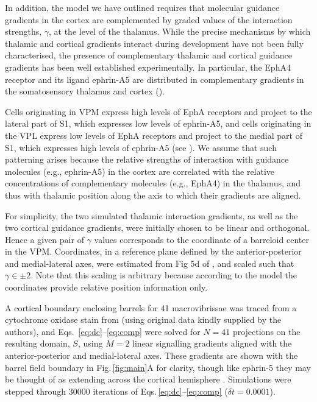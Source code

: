 \documentclass[9pt,lineno]{elife}
\newcommand{\cmnt}[1]{\textcolor{colcmnt}{#1}}
\newcommand{\MPone}[1]{\textcolor{colmpone}{#1}}
\newcommand{\mpfour}[1]{\textcolor{colmpfour}{#1}}
\begin{document}
\MPone{In addition, the model we have outlined requires that molecular
  guidance gradients in the cortex are complemented by graded values of the
  interaction strengths, $\gamma$, at the level of the thalamus. While the
  precise mechanisms by which thalamic and cortical gradients interact during
  development have not been fully characterised, the presence of complementary
  thalamic and cortical guidance gradients has been well established
  experimentally. In particular, the EphA4 receptor and its ligand ephrin-A5
  are distributed in complementary gradients in the somatosensory thalamus and
  cortex} (\citealp{vanderhaeghen_mapping_2000,miller_epha7-ephrin-a5_2006}).

\MPone{Cells originating in VPM express high levels of EphA receptors and
  project to the lateral part of S1, which expresses low levels of ephrin-A5,
  and cells originating in the VPL express low levels of EphA receptors and
  project to the medial part of S1, which expresses high levels of ephrin-A5}
(see
\citealp{gao_regulation_1998,dufour_area_2003,vanderhaeghen_developmental_2004,speer_grading_2005,torii_role_2013}).
\MPone{We assume that such patterning arises because the relative strengths of
  interaction with guidance molecules (e.g., ephrin-A5) in the cortex are
  correlated with the relative concentrations of complementary molecules
  (e.g., EphA4) in the thalamus, and thus with thalamic position along the
  axis to which their gradients are aligned.}

\MPone{For simplicity, the two simulated thalamic interaction gradients, as
  well as the two cortical guidance gradients, were initially chosen to be
  linear and orthogonal. Hence a given pair of $\gamma$ values corresponds to
  the coordinate of a barreloid center in the VPM. Coordinates, in a reference
  plane defined by the anterior-posterior and medial-lateral axes, were
  estimated from Fig 5d of} \cite{haidarliu_size_2001}, \MPone{and scaled
  such that $\gamma\in\pm 2$. Note that this scaling is arbitrary because
  according to the model the coordinates provide relative position information
  only.}

A cortical boundary enclosing barrels for 41 \cmnt{macrovibrissae} was
traced from a cytochrome oxidase stain from \cite{zheng_signal_2001}
\cmnt{(using original data kindly supplied by the authors)}, and
Eqs.~\ref{eq:dc}--\ref{eq:comp} were solved for $N=41$ projections on the
resulting domain, $S$, using $M=2$ linear signalling gradients aligned with
the anterior-posterior and medial-lateral axes.  \mpfour{These gradients are
  shown with the barrel field boundary in Fig.\,\ref{fig:main}A for clarity,
  though like ephrin-5 they may be thought of as extending across the cortical
  hemisphere \citep{miller_epha7-ephrin-a5_2006}. Simulations were stepped
  through 30000 iterations of Eqs.\,\ref{eq:dc}--\ref{eq:comp} ($\delta
  t=0.0001$).}
\end{document}
